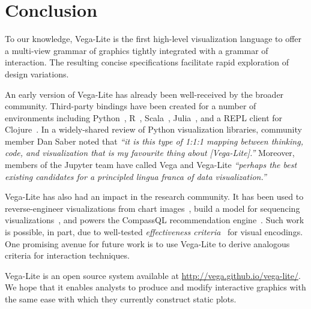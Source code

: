 \section{Conclusion}
\label{sec:vl:conclusion}

To our knowledge, Vega-Lite is the first high-level visualization language to
offer a multi-view grammar of graphics tightly integrated with a grammar of
interaction. The resulting concise specifications facilitate rapid exploration
of design variations.

An early version of Vega-Lite has already been well-received by the broader
community. Third-party bindings have been created for a number of environments
including Python~\cite{vega-lite:altair}, R~\cite{vega-lite:hrbrmstr,
vega-lite:timelyportfolio}, Scala~\cite{vega-lite:scala},
Julia~\cite{vega-lite:julia}, and a REPL client for
Clojure~\cite{vega-lite:clojure}. In a widely-shared review of Python
visualization libraries, community member Dan Saber noted that \emph{``it is
this type of 1:1:1 mapping between thinking, code, and visualization that is my
favourite thing about [Vega-Lite].''} Moreover, members of the Jupyter team have
called Vega and Vega-Lite \emph{``perhaps the best existing candidates for a
principled \emph{lingua franca} of data visualization.''}

Vega-Lite has also had an impact in the research community. It has been used to
reverse-engineer visualizations from chart images~\cite{poco:reverse}, build a
model for sequencing visualizations~\cite{kim:graphscape}, and powers the
CompassQL recommendation engine~\cite{voyager,voyager2,compassql}. Such work is
possible, in part, due to well-tested \emph{effectiveness
criteria}~\cite{bertin:semiology, cleveland:perception, mackinlay:apt} for
visual encodings. One promising avenue for future work is to use Vega-Lite to
derive analogous criteria for interaction techniques.

Vega-Lite is an open source system available at
\url{http://vega.github.io/vega-lite/}. We hope that it enables analysts to
produce and modify interactive graphics with the same ease with which they
currently construct static plots.